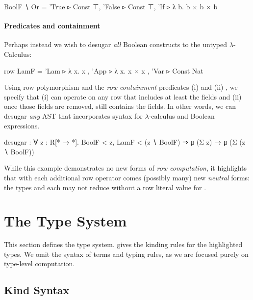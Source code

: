 \documentclass[sigplan,screen]{acmart}
\newif\ifrome\rometrue
\begin{document}
\begin{rosi}
  BoolF ∖ Or
= {'True  ▹ Const ⊤, 
   'False  ▹ Const ⊤, 
   'If ▹ λ b. b × b × b}
\end{rosi}

\paragraph{Predicates and containment}
Perhaps instead we wish to desugar \emph{all} Boolean constructs to the untyped $\lambda$-Calculus: 

\begin{rosi}
row LamF = {'Lam ▹ λ x. x , 
            'App ▹ λ x. x × x , 
            'Var ▹ Const Nat}
\end{rosi}

Using row polymorphism and the \emph{row containment} predicates (i)  and (ii) , we specify that (i)  can operate on any row  that includes at least the  fields and (ii) once those fields are removed, still contains the  fields. In other words, we can desugar \emph{any} AST that incorporates syntax for $\lambda$-calculus and Boolean expressions.

\begin{rosi}
desugar : ∀ z : R[* → *]. BoolF < z, 
          LamF < (z ∖ BoolF) ⇒
          μ (Σ z) → μ (Σ (z ∖ BoolF))  
\end{rosi}

While this example demonstrates no new forms of \emph{row computation}, it highlights that with each additional row operator comes (possibly many) new \emph{neutral} forms: the types  and  each may not reduce without a row literal value for .
\fi


\section{The \Rome{} Type System}
\label{sec:rome}
\ifrome

This section defines the \Rome{} type system.  gives the kinding rules for the highlighted \Rome{} types. We omit the syntax of terms and typing rules, as we are focused purely on type-level computation.

\subsection{Kind Syntax}

\end{document}
